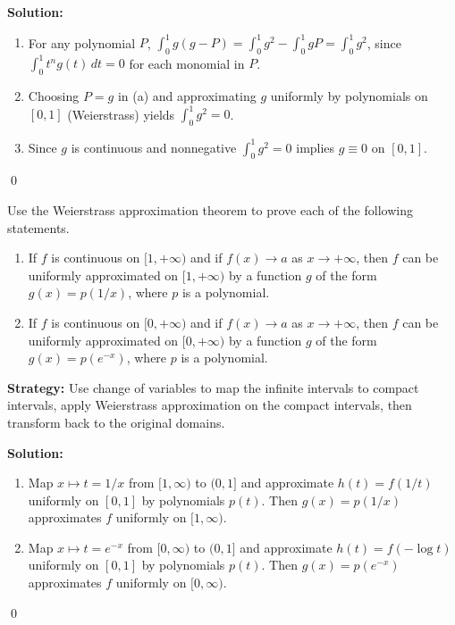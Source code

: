 \bigskip\noindent\textbf{Solution:}
\begin{enumerate}[label=(\alph*)]
\item For any polynomial $P$, $\int_0^1 g(g-P)=\int_0^1 g^2-\int_0^1 gP=\int_0^1 g^2$, since $\int_0^1 t^n g(t)\,dt=0$ for each monomial in $P$.
\item Choosing $P=g$ in (a) and approximating $g$ uniformly by polynomials on $[0,1]$ (Weierstrass) yields $\int_0^1 g^2=0$.
\item Since $g$ is continuous and nonnegative $\int_0^1 g^2=0$ implies $g\equiv0$ on $[0,1]$.
\end{enumerate}\qed


\begin{problembox}
Use the Weierstrass approximation theorem to prove each of the following statements.
\begin{enumerate}[label=(\alph*)]
\item If $f$ is continuous on $[1, +\infty)$ and if $f(x) \to a$ as $x \to +\infty$, then $f$ can be uniformly approximated on $[1, +\infty)$ by a function $g$ of the form $g(x) = p(1/x)$, where $p$ is a polynomial.
\item If $f$ is continuous on $[0, +\infty)$ and if $f(x) \to a$ as $x \to +\infty$, then $f$ can be uniformly approximated on $[0, +\infty)$ by a function $g$ of the form $g(x) = p(e^{-x})$, where $p$ is a polynomial.
\end{enumerate}
\end{problembox}

\noindent\textbf{Strategy:} Use change of variables to map the infinite intervals to compact intervals, apply Weierstrass approximation on the compact intervals, then transform back to the original domains.

\bigskip\noindent\textbf{Solution:}
\begin{enumerate}[label=(\alph*)]
\item Map $x\mapsto t=1/x$ from $[1,\infty)$ to $(0,1]$ and approximate $h(t)=f(1/t)$ uniformly on $[0,1]$ by polynomials $p(t)$. Then $g(x)=p(1/x)$ approximates $f$ uniformly on $[1,\infty)$.
\item Map $x\mapsto t=e^{-x}$ from $[0,\infty)$ to $(0,1]$ and approximate $h(t)=f(-\log t)$ uniformly on $[0,1]$ by polynomials $p(t)$. Then $g(x)=p(e^{-x})$ approximates $f$ uniformly on $[0,\infty)$.
\end{enumerate}\qed


